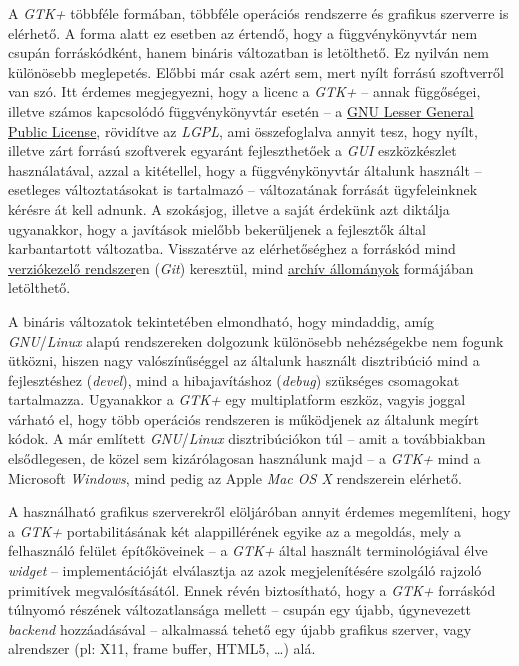 A \textit{GTK+} többféle formában, többféle operációs rendszerre és grafikus szerverre is elérhető. A forma alatt ez esetben az értendő, hogy a függvénykönyvtár nem csupán forráskódként, hanem bináris  változatban is letölthető. Ez nyilván nem különösebb meglepetés. Előbbi már csak azért sem, mert nyílt forrású szoftverről van szó. Itt érdemes megjegyezni, hogy a licenc a \textit{GTK+} -- annak függőségei, illetve számos kapcsolódó függvénykönyvtár esetén -- a \href{http://www.gnu.org/licenses/lgpl-2.1.html}{GNU Lesser General Public License}, rövidítve az \textit{LGPL}, ami összefoglalva annyit tesz, hogy nyílt, illetve zárt forrású szoftverek egyaránt fejleszthetőek a \textit{GUI} eszközkészlet használatával, azzal a kitétellel, hogy a függvénykönyvtár általunk használt -- esetleges változtatásokat is tartalmazó -- változatának forrását ügyfeleinknek kérésre át kell adnunk. A szokásjog, illetve a saját érdekünk azt diktálja ugyanakkor, hogy a javítások mielőbb bekerüljenek a fejlesztők által karbantartott változatba. Visszatérve az elérhetőséghez a forráskód mind \href{http://git.gnome.org/browse/gtk+/}{verziókezelő rendszer}en (\textit{Git}) keresztül, mind \href{ftp://ftp.gtk.org/pub/gtk/}{archív állományok} formájában letölthető.

A bináris változatok tekintetében elmondható, hogy mindaddig, amíg \textit{GNU}/\textit{Linux} alapú rendszereken dolgozunk különösebb nehézségekbe nem fogunk ütközni, hiszen nagy valószínűséggel az általunk használt disztribúció mind a fejlesztéshez (\textit{devel}), mind a hibajavításhoz (\textit{debug}) szükséges csomagokat tartalmazza. Ugyanakkor a \textit{GTK+} egy multiplatform eszköz, vagyis joggal várható el, hogy több operációs rendszeren is működjenek az általunk megírt kódok. A már említett \textit{GNU}/\textit{Linux} disztribúciókon túl -- amit a továbbiakban elsődlegesen, de közel sem kizárólagosan használunk majd -- a \textit{GTK+} mind a Microsoft \textit{Windows}, mind pedig az Apple \textit{Mac OS X} rendszerein elérhető.

A használható grafikus szerverekről elöljáróban annyit érdemes megemlíteni, hogy a \textit{GTK+} portabilitásának két alappillérének egyike az a megoldás, mely a felhasználó felület építőköveinek -- a \textit{GTK+} által használt terminológiával élve \textit{widget} -- implementációját elválasztja az azok megjelenítésére szolgáló rajzoló primitívek megvalósításától. Ennek révén biztosítható, hogy a \textit{GTK+} forráskód túlnyomó részének változatlansága mellett -- csupán egy újabb, úgynevezett \textit{backend} hozzáadásával -- alkalmassá tehető egy újabb grafikus szerver, vagy alrendszer (pl: X11, frame buffer, HTML5, \dots) alá.

